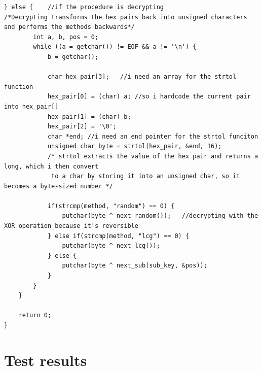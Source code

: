 \documentclass[a4paper,10pt]{article}
\begin{document}
\begin{lstlisting}[style = code, title = Enigma++.c]
    } else {    //if the procedure is decrypting
/*Decrypting transforms the hex pairs back into unsigned characters and performs the methods backwards*/
        int a, b, pos = 0;
        while ((a = getchar()) != EOF && a != '\n') {
            b = getchar();

            char hex_pair[3];   //i need an array for the strtol function
            hex_pair[0] = (char) a; //so i hardcode the current pair into hex_pair[]
            hex_pair[1] = (char) b;
            hex_pair[2] = '\0';
            char *end; //i need an end pointer for the strtol funciton
            unsigned char byte = strtol(hex_pair, &end, 16); 
            /* strtol extracts the value of the hex pair and returns a long, which i then convert
             to a char by storing it into an unsigned char, so it becomes a byte-sized number */

            if(strcmp(method, "random") == 0) {
                putchar(byte ^ next_random());   //decrypting with the XOR operation because it's reversible
            } else if(strcmp(method, "lcg") == 0) {
                putchar(byte ^ next_lcg());
            } else {
                putchar(byte ^ next_sub(sub_key, &pos));
            }
        }
    }
    
    return 0;
}
\end{lstlisting}
 
\section{Test results}
 
\end{document}
